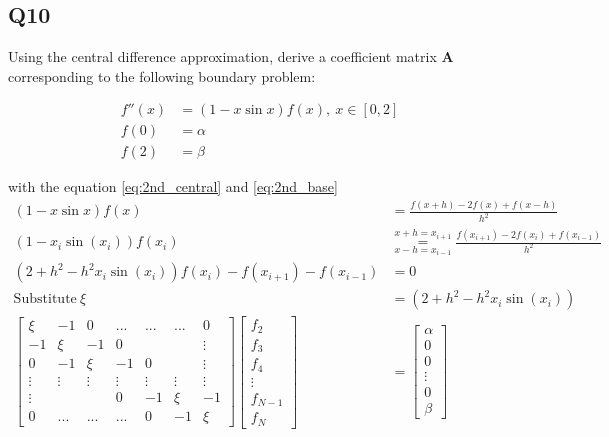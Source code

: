 \subsection*{Q10}
Using the central difference approximation, derive a coefficient matrix $\mathbf{A}$ corresponding to the following boundary problem:

\begin{align}
  f''(x) &=(1-x\sin{x}) f(x),\ x \in [0,2]\label{eq:2nd_base}\\
  f(0) &= \alpha\\
  f(2) &= \beta
\end{align}

with the equation \ref{eq:2nd_central} and \ref{eq:2nd_base} 
\begin{align}
(1-x\sin{x}) f(x) &= \frac{f(x+h)-2f(x)+f(x-h)}{h^2}\\
(1-x_{i} \sin(x_{i})) f(x_i) &\overset{x + h= x_{i+1}}{\underset{x - h= x_{i-1}}{=}} \frac{f(x_{i+1})-2f(x_i)+f(x_{i-1})}{h^2}\\
(2 + h^2-h^2x_{i} \sin(x_{i})) f(x_i) - f(x_{i+1}) - f(x_{i-1}) &= 0\\
\mathrm{Substitute}\ \xi\ &= (2 + h^2-h^2x_{i} \sin(x_{i}))\\
\begin{bmatrix}
\xi & -1 & 0  & ... & ... & ... & 0\\
-1 & \xi & -1  & 0& &  & \vdots\\
0 & -1 & \xi & -1& 0 & &  \vdots\\
\vdots & \vdots & \vdots& \vdots & \vdots& \vdots & \vdots\\
 \vdots & &  & 0 & -1 & \xi & -1\\
0 & ... & ... & ... & 0 & -1 & \xi
\end{bmatrix}\begin{bmatrix}
f_2 \\ f_3 \\ f_4 \\ \vdots\\f_{N-1}\\ f_N
\end{bmatrix}&= \begin{bmatrix}
\alpha \\ 0 \\ 0 \\ \vdots\\ 0 \\ \beta
\end{bmatrix}
\end{align}
